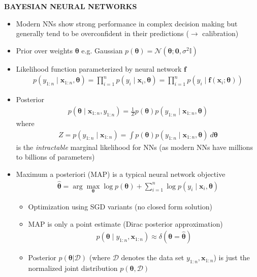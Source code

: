 \begin{whitebox}{\textbf{BAYESIAN NEURAL NETWORKS}}
    \begin{itemize}
        \item Modern NNs show strong performance in complex decision making but generally tend to be overconfident in their predictions ($\to$ calibration)
        \item Prior over weights $\bm{\theta}$ e.g. Gaussian $p(\bm{\theta})=\mathcal{N}(\bm{\theta};\bm{0},\sigma^2\mathbb{I})$
        \item Likelihood function parameterized by neural network $\bm{f}$
        \begin{align*}
            p(y_{1:n}\mid\bm{x}_{1:n},\bm{\theta})=\prod_{i=1}^np(y_i\mid\bm{x}_i,\bm{\theta})=\prod_{i=1}^np(y_i\mid\bm{f}(\bm{x}_i;\bm{\theta}))
        \end{align*}
        \item Posterior
        \begin{align*}
            p(\bm{\theta}\mid\bm{x}_{1:n},y_{1:n})=\frac{1}{Z}p(\bm{\theta})p(y_{1:n}\mid\bm{x}_{1:n},\bm{\theta})
        \end{align*}
        where
        \begin{align*}
            Z=p(y_{1:n}\mid\bm{x}_{1:n})=\int p(\bm{\theta})p(y_{1:n}\mid\bm{x}_{1:n},\bm{\theta})\ d\bm{\theta}
        \end{align*}
        is the \textit{intractable} marginal likelihood for NNs (as modern NNs have millions to billions of parameters)
        \item Maximum a posteriori (MAP) is a typical neural network objective
        \begin{align*}
            \hat{\bm{\theta}}=\arg\max_{\bm{\theta}}\log p(\bm{\theta})+\sum_{i=1}^n\log p(y_i\mid\bm{x}_i,\bm{\theta})
        \end{align*}
        \begin{itemize}
            \item Optimization using SGD variants (no closed form solution)
            \item MAP is only a point estimate (Dirac posterior approximation)
            \begin{align*}
                p(\bm{\theta}\mid y_{1:n},\bm{x}_{1:n})\approx\delta(\bm{\theta}=\hat{\bm{\theta}})
            \end{align*}
            \item Posterior $p(\bm{\theta}|\mathcal{D})$ (where $\mathcal{D}$ denotes the data set $y_{1:n},\bm{x}_{1:n}$) is just the normalized joint distribution $p(\bm{\theta},\mathcal{D})$

\end{itemize}
\end{itemize}
\end{whitebox}
